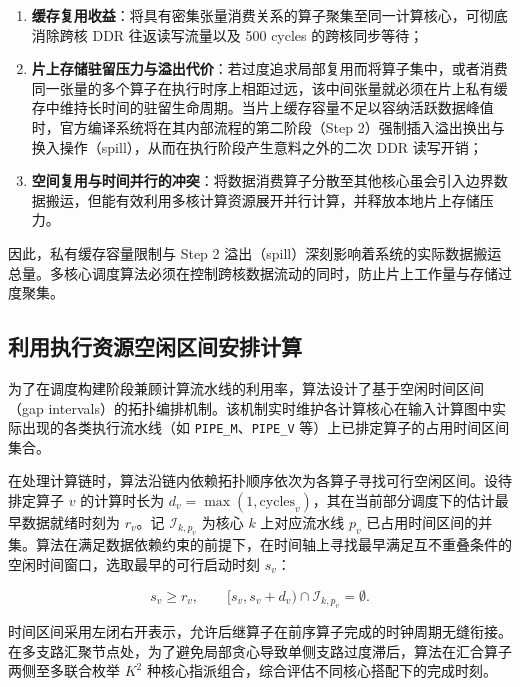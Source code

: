 \documentclass[anonymous,notoc]{gmcm2026}
\providecommand{\tightlist}{\setlength{\itemsep}{0pt}\setlength{\parskip}{0pt}}
\begin{document}
\begin{enumerate}
\def\labelenumi{\arabic{enumi}.}
\tightlist
\item
  \textbf{缓存复用收益}：将具有密集张量消费关系的算子聚集至同一计算核心，可彻底消除跨核 DDR 往返读写流量以及 500 cycles 的跨核同步等待；
\item
  \textbf{片上存储驻留压力与溢出代价}：若过度追求局部复用而将算子集中，或者消费同一张量的多个算子在执行时序上相距过远，该中间张量就必须在片上私有缓存中维持长时间的驻留生命周期。当片上缓存容量不足以容纳活跃数据峰值时，官方编译系统将在其内部流程的第二阶段（Step 2）强制插入溢出换出与换入操作（spill），从而在执行阶段产生意料之外的二次 DDR 读写开销；
\item
  \textbf{空间复用与时间并行的冲突}：将数据消费算子分散至其他核心虽会引入边界数据搬运，但能有效利用多核计算资源展开并行计算，并释放本地片上存储压力。
\end{enumerate}

因此，私有缓存容量限制与 Step 2 溢出（spill）深刻影响着系统的实际数据搬运总量。多核心调度算法必须在控制跨核数据流动的同时，防止片上工作量与存储过度聚集。

\subsection{利用执行资源空闲区间安排计算}

为了在调度构建阶段兼顾计算流水线的利用率，算法设计了基于空闲时间区间（gap intervals）的拓扑编排机制。该机制实时维护各计算核心在输入计算图中实际出现的各类执行流水线（如 \texttt{PIPE\_M}、\texttt{PIPE\_V} 等）上已排定算子的占用时间区间集合。

在处理计算链时，算法沿链内依赖拓扑顺序依次为各算子寻找可行空闲区间。设待排定算子 \(v\) 的计算时长为 \(d_v = \max(1, \text{cycles}_v)\)，其在当前部分调度下的估计最早数据就绪时刻为 \(r_v\)。记 \(\mathcal{I}_{k, p_v}\) 为核心 \(k\) 上对应流水线 \(p_v\) 已占用时间区间的并集。算法在满足数据依赖约束的前提下，在时间轴上寻找最早满足互不重叠条件的空闲时间窗口，选取最早的可行启动时刻 \(s_v\)：

\begin{equation}
s_v \ge r_v, \qquad [s_v, s_v + d_v) \cap \mathcal{I}_{k, p_v} = \emptyset.
\end{equation}

时间区间采用左闭右开表示，允许后继算子在前序算子完成的时钟周期无缝衔接。在多支路汇聚节点处，为了避免局部贪心导致单侧支路过度滞后，算法在汇合算子两侧至多联合枚举 \(K^2\) 种核心指派组合，综合评估不同核心搭配下的完成时刻。
\end{document}
